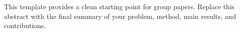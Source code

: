 This template provides a clean starting point for group papers. Replace this abstract with the final summary of your problem, method, main results, and contributions.
